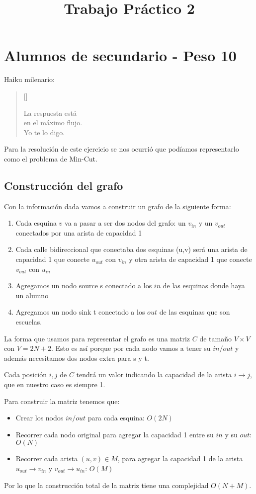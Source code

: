 \documentclass[a4paper]{article}
\title{Trabajo Práctico 2}
\author{}
\newcommand{\verso}[1] {
\settowidth{\versewidth}{123456789012345678901234567890}%
\begin{minipage}[t]{\dimexpr\versewidth+1pt\relax}
\begin{verse}[\versewidth]
{\fontfamily{qzc}\selectfont\large
  #1
}
\end{verse}
\end{minipage}\bigskip
}
\begin{document}
\maketitle

\section{Alumnos de secundario - Peso 10}

\begin{center}
Haiku milenario:
\verso{
La respuesta está\\
en el máximo flujo. \\
Yo te lo digo. \\
}
\end{center}


Para la resolución de este ejercicio se nos ocurrió que podíamos representarlo como el problema de Min-Cut. 

\subsection{Construcción del grafo} 
Con la información dada vamos a construir un grafo de la siguiente forma:
\begin{enumerate}
\item Cada esquina $v$ va a pasar a ser dos nodos del grafo: un $v_{in}$ y un $v_{out}$ conectados por una arista de capacidad 1
\item Cada calle bidireccional que conectaba dos esquinas (u,v) será una arista de capacidad 1 que conecte $u_{out}$ con $v_{in}$ y otra arista de capacidad 1 que conecte $v_{out}$ con $u_{in}$ 
\item Agregamos un nodo source s conectado a los $in$ de las esquinas donde haya un alumno
\item Agregamos un nodo sink t conectado a los $out$ de las esquinas que son escuelas.
\end{enumerate}

La forma que usamos para representar el grafo es una matriz $C$ de tamaño $V\times{}V$ con $V = 2N+2$. Esto es así porque por cada nodo vamos a tener su $in/out$ y además necesitamos dos nodos extra para s y t.

Cada posición $i,j$ de $C$ tendrá un valor indicando la capacidad de la arista $i \rightarrow j$, que en nuestro caso es siempre 1.

Para construir la matriz tenemos que:
\begin{itemize}
\item Crear los nodos $in/out$ para cada esquina: $O(2N)$
\item Recorrer cada nodo original para agregar la capacidad 1 entre su $in$ y su $out$: $O(N)$
\item Recorrer cada arista $(u,v)\in M$, para agregar la capacidad 1 de la arista $u_{out} \rightarrow v_{in}$ y $v_{out} \rightarrow u_{in}$: $O(M)$
\end{itemize}
Por lo que la construcción total de la matriz tiene una complejidad $O(N+M)$.
\end{document}
